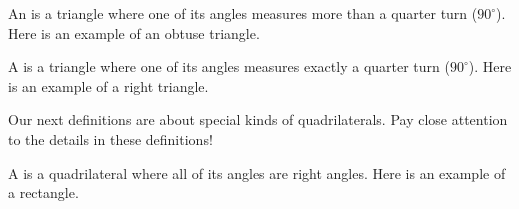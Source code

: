 \documentclass{ximera}
\begin{document}
\begin{definition}
	An  is a triangle where one of its angles measures more than a quarter turn ($90^{\circ}$). Here is an example of an obtuse triangle.
	\begin{image}
	\end{image}
\end{definition}

\begin{definition}
	A  is a triangle where one of its angles measures exactly a quarter turn ($90^{\circ}$). Here is an example of a right triangle.
	\begin{image}
	\end{image}
\end{definition}

Our next definitions are about special kinds of quadrilaterals. Pay close attention to the details in these definitions!

\begin{definition}
	A  is a quadrilateral where all of its angles are right angles. Here is an example of a rectangle.
	\begin{image}
	\end{image}
\end{definition}
\end{document}
